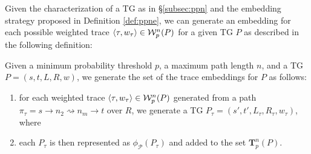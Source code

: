 Given the characterization of a TG as in \S\ref{subsec:ppn} and the embedding strategy proposed in Definition \ref{def:ppne}, we can generate an embedding for each possible weighted trace $\braket{\tau,w_\tau}\in\mathcal{W}_p^n(P)$ for a given TG $P$ as described in the following definition:
\begin{definition}
	Given a minimum probability threshold $p$, a maximum path length $n$, and a TG $P=(s,t,L,R,w)$, we generate the set of the trace embeddings for $P$ as follows:
	\begin{enumerate}
		\item for each weighted trace $\braket{\tau,w_\tau}\in\mathcal{W}_p^n(P)$ generated from a path $\pi_\tau=s\to n_2\rightsquigarrow n_m\to t$ over $R$, we generate a TG $P_\tau=(s',t',L_\tau,R_\tau,w_\tau)$, where 
		\item each $P_\tau$ is then represented as $\phi_{\mathcal{P}}(P_\tau)$ and added to the set $\mathbf{T}_p^n(P)$.
	\end{enumerate}
\end{definition}

